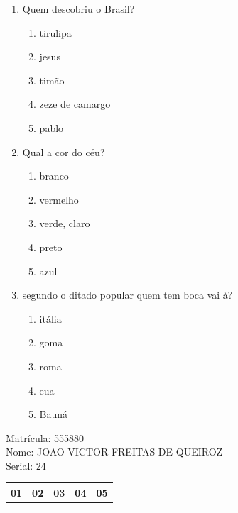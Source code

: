 \documentclass[10pt,a4paper,twocolumn]{report}
\begin{document}
 \begin{enumerate} 
    \item  Quem descobriu o Brasil?





    \begin{enumerate}
    \item  tirulipa

\item  jesus

\item  timão

\item  zeze de camargo

\item  pablo


    \end{enumerate} 
    \item  Qual a cor do céu?





    \begin{enumerate}
    \item  branco

\item  vermelho

\item  verde, claro

\item  preto

\item  azul


    \end{enumerate} 
    \item  segundo o ditado popular quem tem boca vai à?





    \begin{enumerate}
    \item  itália

\item  goma

\item  roma

\item  eua

\item  Bauná


    \end{enumerate}\end{enumerate} 
Matrícula: 555880\\ Nome: JOAO VICTOR FREITAS DE QUEIROZ \\ Serial: 24\\
\begin{tabular}{|l|l|l|l|l|}\hline
01  &02  &03  &04  &05 \\ \hline 
 & & & & \\ \hline 
\end{tabular}
 \cleardoublepage 
\end{document}
